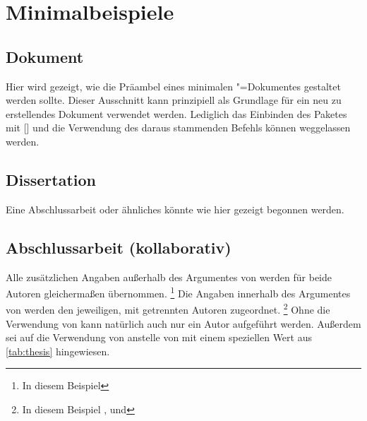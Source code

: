 \chapter{Minimalbeispiele}
%
%
\section{Dokument}
%
%
Hier wird gezeigt, wie die Präambel eines minimalen "=Dokumentes 
gestaltet werden sollte. Dieser Ausschnitt kann prinzipiell als Grundlage für 
ein neu zu erstellendes Dokument verwendet werden. Lediglich das Einbinden des 
Paketes  mit [] und 
die Verwendung des daraus stammenden Befehls  können 
weggelassen werden.

\section{Dissertation}
%
%
%
Eine Abschlussarbeit oder ähnliches könnte wie hier gezeigt begonnen werden.

\section{Abschlussarbeit (kollaborativ)}
%
%
%
%
Alle zusätzlichen Angaben außerhalb des Argumentes von  werden 
für beide Autoren gleichermaßen übernommen.%
\footnote{In diesem Beispiel }
Die Angaben innerhalb des Argumentes von  werden den jeweiligen, 
mit  getrennten Autoren zugeordnet.%
\footnote{%
  In diesem Beispiel ,  und 
}
Ohne die Verwendung von  kann natürlich auch nur ein Autor 
aufgeführt werden. Außerdem sei auf die Verwendung von  anstelle 
von  mit einem speziellen Wert aus \autoref{tab:thesis} 
hingewiesen.

